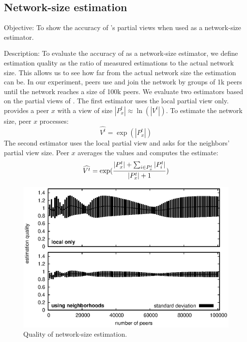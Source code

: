 \subsection{Network-size estimation}

\begin{asparadesc}
\item [Objective:] To show the accuracy of \SPRAY's partial views when used as a
  network-size estimator.
\item [Description:] To evaluate the accuracy of \SPRAY as a
  network-size estimator, we define estimation quality as the ratio of
  measured estimations to the actual network size. This allows us to
  see how far from the actual network size the estimation can be.  In
  our experiment, peers use \SPRAY and join the network by groups of
  1k peers until the network reaches a size of 100k peers. We evaluate
  two estimators based on the partial views of \SPRAY. The first
  estimator uses the local partial view only.  \SPRAY provides a peer
  $x$ with a view of size $|P^t_x| \approx \ln(|V^t|)$. To estimate
  the network size, peer $x$ processes:
  \begin{equation*}
    \widehat{V^t}= \exp{(|P^t_x|)}
  \end{equation*}
  The second estimator uses the local partial view and asks for the neighbors'
  partial view size. Peer $x$ averages the values and computes the estimate:
  \begin{equation*}
    \widehat{V^t} = \exp({ {|P^t_x| + \sum_{i \in P^t_x} {|P^t_i|}} \over{|P^t_x|+1} })
  \end{equation*}

\begin{figure}
  \centering
  \includegraphics[width=\SCALE\textwidth]{img/estimator.eps}
  \caption{\label{fig:estimator}Quality of network-size estimation.}
\end{figure}


\end{asparadesc}
